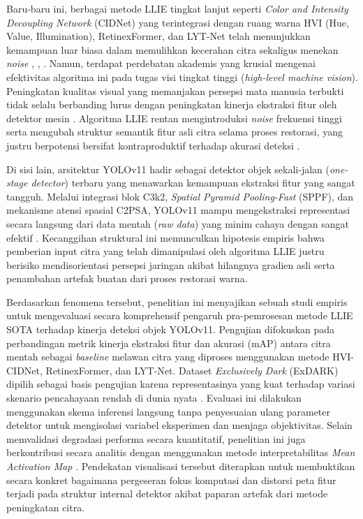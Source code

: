 ﻿\documentclass[conference]{IEEEtran}
\begin{document}
Baru-baru ini, berbagai metode LLIE tingkat lanjut seperti \textit{Color and Intensity Decoupling Network} (CIDNet) yang terintegrasi dengan ruang warna HVI (Hue, Value, Illumination), RetinexFormer, dan LYT-Net telah menunjukkan kemampuan luar biasa dalam memulihkan kecerahan citra sekaligus menekan \textit{noise} \cite{yan2025hvi}, \cite{cai2023retinexformer}, \cite{brateanu2025lytnet}. Namun, terdapat perdebatan akademis yang krusial mengenai efektivitas algoritma ini pada tugas visi tingkat tinggi (\textit{high-level machine vision}). Peningkatan kualitas visual yang memanjakan persepsi mata manusia terbukti tidak selalu berbanding lurus dengan peningkatan kinerja ekstraksi fitur oleh detektor mesin \cite{wu2024llieeffect}. Algoritma LLIE rentan mengintroduksi \textit{noise} frekuensi tinggi serta mengubah struktur semantik fitur asli citra selama proses restorasi, yang justru berpotensi bersifat kontraproduktif terhadap akurasi deteksi \cite{wang2023yolov5lowlight}.

Di sisi lain, arsitektur YOLOv11 hadir sebagai detektor objek sekali-jalan (\textit{one-stage detector}) terbaru yang menawarkan kemampuan ekstraksi fitur yang sangat tangguh. Melalui integrasi blok C3k2, \textit{Spatial Pyramid Pooling-Fast} (SPPF), dan mekanisme atensi spasial C2PSA, YOLOv11 mampu mengekstraksi representasi secara langsung dari data mentah (\textit{raw data}) yang minim cahaya dengan sangat efektif \cite{khanam2024yolov11}. Kecanggihan struktural ini memunculkan hipotesis empiris bahwa pemberian input citra yang telah dimanipulasi oleh algoritma LLIE justru berisiko mendisorientasi persepsi jaringan akibat hilangnya gradien asli serta penambahan artefak buatan dari proses restorasi warna.

Berdasarkan fenomena tersebut, penelitian ini menyajikan sebuah studi empiris untuk mengevaluasi secara komprehensif pengaruh pra-pemrosesan metode LLIE SOTA terhadap kinerja deteksi objek YOLOv11. Pengujian difokuskan pada perbandingan metrik kinerja ekstraksi fitur dan akurasi (mAP) antara citra mentah sebagai \textit{baseline} melawan citra yang diproses menggunakan metode HVI-CIDNet, RetinexFormer, dan LYT-Net. Dataset \textit{Exclusively Dark} (ExDARK) dipilih sebagai basis pengujian karena representasinya yang kuat terhadap variasi skenario pencahayaan rendah di dunia nyata \cite{loh2019exdark}. Evaluasi ini dilakukan menggunakan skema inferensi langsung tanpa penyesuaian ulang parameter detektor untuk mengisolasi variabel eksperimen dan menjaga objektivitas. Selain memvalidasi degradasi performa secara kuantitatif, penelitian ini juga berkontribusi secara analitis dengan menggunakan metode interpretabilitas \textit{Mean Activation Map} \cite{metrics2026formulas}. Pendekatan visualisasi tersebut diterapkan untuk membuktikan secara konkret bagaimana pergeseran fokus komputasi dan distorsi peta fitur terjadi pada struktur internal detektor akibat paparan artefak dari metode peningkatan citra.
\end{document}
